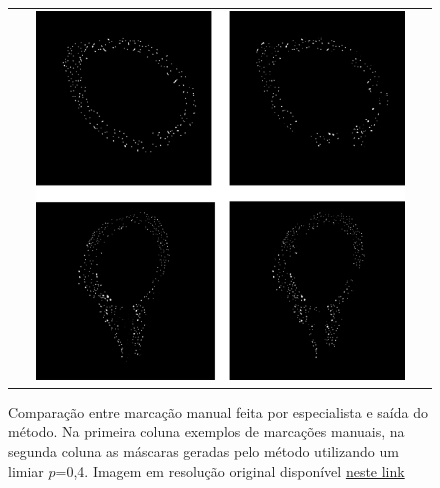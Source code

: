 \begin{figure}[H]
    \center
    \begin{tabular}{@{}c@{}}
        \includegraphics[width=0.9\textwidth]{figures/4_results/figure-manuel-net-results-comparision_lower_res.png}
        \\[\abovecaptionskip]
    \end{tabular}
  
    \caption[Comparação entre marcação manual feita por especialista e saída do método.]{Comparação entre marcação manual feita por especialista e saída do método. Na primeira coluna exemplos de marcações manuais, na segunda coluna as máscaras geradas pelo método utilizando um limiar $p$=0,4. Imagem em resolução original disponível \href{https://github.com/igorgonribs/dissertacao/blob/master/figures/4_results/figure-manuel-net-results-comparision.png}{neste link}}
    \label{fig:marcacoes-final}
\end{figure}


